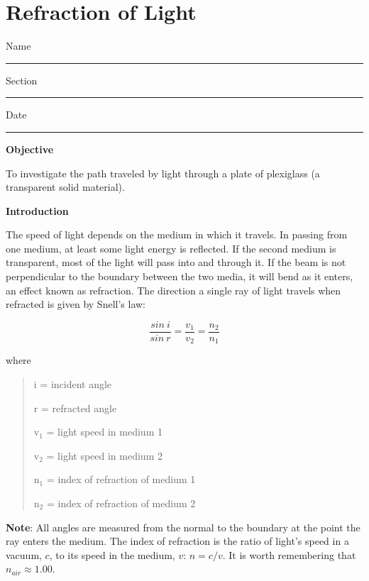 
\section{Refraction of Light}

Name \rule{2.0in}{0.1pt}\hfill{}Section \rule{1.0in}{0.1pt}\hfill{}Date
\rule{1.0in}{0.1pt}

\textbf{Objective}

To investigate the path traveled by light through a plate of plexiglass
(a transparent solid material).

\textbf{Introduction}

The speed of light depends on the medium in which it travels. In passing
from one medium, at least some light energy is reflected. If the second
medium is transparent, most of the light will pass into and through
it. If the beam is not perpendicular to the boundary between the two
media, it will bend as it enters, an effect known as refraction. The
direction a single ray of light travels when refracted is given by
Snell's law:

\begin{displaymath} \frac{sin~i}{sin~r} = \frac{v_1}{v_2} = \frac{n_2}{n_1} \end{displaymath}

where

\begin{quote}
i = incident angle

r = refracted angle

v\( _{1} \) = light speed in medium 1

v\( _{2} \) = light speed in medium 2

n\( _{1} \) = index of refraction of medium 1 

n\( _{2} \) = index of refraction of medium 2
\end{quote}
\textbf{Note}: All angles are measured from the normal to the boundary
at the point the ray enters the medium. The index of refraction is
the ratio of light's speed in a vacuum, $c$, to its speed in the medium,
$v$: $n = c / v$. It is worth remembering that $n_{air} \approx 1.00$.

